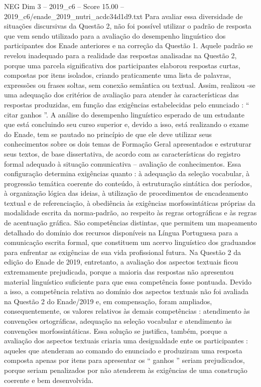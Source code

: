 \begin{textsample}{NEG Dim 3 – 2019\_c6 – Score 15.00 – 2019\_c6/enade\_2019\_nutri\_acdc34d1d9.txt}
Para avaliar essa diversidade de situações discursivas da Questão 2, não foi possível utilizar o padrão de resposta que vem sendo utilizado para a avaliação do desempenho linguístico dos participantes dos Enade anteriores e na correção da Questão 1.
Aquele padrão se revelou inadequado para a realidade das respostas analisadas na Questão 2, porque uma parcela significativa dos participantes elaborou respostas curtas, compostas por itens isolados, criando praticamente uma lista de palavras, expressões ou frases soltas, sem conexão semântica ou textual.
Assim, realizou -se uma adequação dos critérios de avaliação para atender às características das respostas produzidas, em função das exigências estabelecidas pelo enunciado : “ citar ganhos ”.
A análise do desempenho linguístico esperado de um estudante que está concluindo seu curso superior e, devido a isso, está realizando o exame do Enade, tem se pautado no princípio de que ele deve utilizar seus conhecimentos sobre os dois temas de Formação Geral apresentados e estruturar seus textos, de base dissertativa, de acordo com as características do registro formal adequado à situação comunicativa – avaliação de conhecimentos.
Essa configuração determina exigências quanto : à adequação da seleção vocabular, à progressão temática coerente do conteúdo, à estruturação sintática dos períodos, à organização lógica das ideias, à utilização de procedimentos de encadeamento textual e de referenciação, à obediência às exigências morfossintáticas próprias da modalidade escrita da norma-padrão, ao respeito às regras ortográficas e às regras de acentuação gráfica.
São competências distintas, que permitem um mapeamento detalhado do domínio dos recursos disponíveis na Língua Portuguesa para a comunicação escrita formal, que constituem um acervo linguístico dos graduandos para enfrentar as exigências de sua vida profissional futura.
Na Questão 2 da edição do Enade de 2019, entretanto, a avaliação dos aspectos textuais ficou extremamente prejudicada, porque a maioria das respostas não apresentou material linguístico suficiente para que essa competência fosse pontuada.
Devido a isso, a competência relativa ao domínio dos aspectos textuais não foi avaliada na Questão 2 do Enade/2019 e, em compensação, foram ampliados, consequentemente, os valores relativos às demais competências : atendimento às convenções ortográficas, adequação na seleção vocabular e atendimento às convenções morfossintáticas.
Essa solução se justifica, também, porque a avaliação dos aspectos textuais criaria uma desigualdade ente os participantes : aqueles que atenderam ao comando do enunciado e produziram uma resposta composta apenas por itens para apresentar os “ ganhos ” seriam prejudicados, porque seriam penalizados por não atenderem às exigências de uma construção coerente e bem desenvolvida.

\end{textsample}
